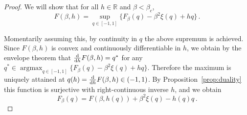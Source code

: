 \documentclass[11pt]{article}
\theoremstyle{definition}
\numberwithin{equation}{section}
\def\reals{{\mathbb R}}
\newcommand{\<}{\langle}
\renewcommand{\>}{\rangle}
\def\de{{\rm d}}
\DeclareMathOperator*{\argmax}{\arg\max}
\begin{document}
\begin{proof}
We will show that for all $h \in \reals$ and $\beta < \beta_c$, 
 \begin{equation}\label{eq:legendre}
 F(\beta,h) = \sup_{q \in [-1,1]} \Big\{F_\beta(q) - \beta^2 \xi(q) + hq\Big\}\,.
 \end{equation}

Momentarily assuming this, by continuity in $q$ the above supremum is achieved. Since $F(\beta,h)$ is convex and continuously differentiable in $h$, we obtain by the envelope theorem that $\frac{\de}{\de h}F(\beta,h) = q^*$ for any $q^* \in \argmax_{q \in [-1,1]} \{F_{\beta}(q) - \beta^2\xi(q) + hq\}$. Therefore the maximum is uniquely attained at $q(h) = \frac{\de}{\de h}F(\beta,h) \in (-1,1)$. By Proposition~\ref{prop:duality} this function is surjective with right-continuous inverse $h$, and we obtain
\[F_{\beta}(q) = F(\beta,h(q)) +\beta^2 \xi(q) - h(q)q\,.\]  


\end{proof}
\end{document}
